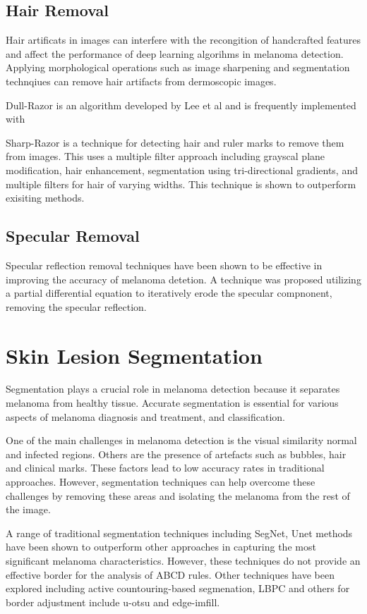 \subsection{Hair Removal}
Hair artificats in images can interfere with the recongition of handcrafted features and affect the performance of deep learning algorihms in melanoma detection\cite{kasmi2023}. Applying morphological operations such as image sharpening and segmentation technqiues can remove hair artifacts from dermoscopic images\cite{kasmi2023}.

Dull-Razor is an algorithm developed by Lee et al\cite{Lee1997} and is frequently implemented with 

Sharp-Razor\cite{kasmi2023} is a technique for detecting hair and ruler marks to remove them from  images. This uses a multiple filter approach including grayscal plane modification, hair enhancement, segmentation using tri-directional gradients, and multiple filters for hair of varying widths. This technique is shown to outperform exisiting methods.

\subsection{Specular Removal}
Specular reflection removal techniques have been shown to be effective in improving the accuracy of melanoma detetion\cite{Shen2009}. A technique was proposed utilizing a partial differential equation to iteratively erode the specular compnonent, removing the specular reflection\cite{Shen2009}.

\section{Skin Lesion Segmentation}
Segmentation plays a crucial role in melanoma detection because it separates melanoma from healthy tissue. Accurate segmentation is essential for various aspects of melanoma diagnosis and treatment, and classification\cite{Albahli2020}.

One of the main challenges in melanoma detection is the visual similarity normal and infected regions. Others are the presence of artefacts such as bubbles, hair and clinical marks\cite{Albahli2020}. These factors lead to low accuracy rates in traditional approaches. However, segmentation techniques can help overcome these challenges by removing these areas and isolating the melanoma from the rest of the image.

A range of traditional segmentation techniques including SegNet, Unet methods have been shown to outperform other approaches in capturing the most significant melanoma characteristics. However, these techniques do not provide an effective border for the analysis of ABCD rules. Other techniques have been explored including active countouring-based segmenation\cite{Riaz2019}, LBPC and others for border adjustment include u-otsu and edge-imfill.


